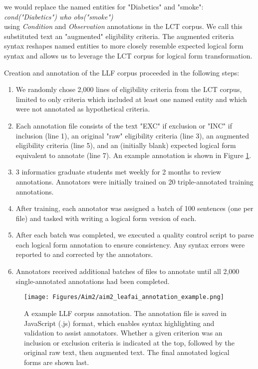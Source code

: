\documentclass[../main.tex]{subfiles}
\begin{document}
\noindent we would replace the named entities for "Diabetics" and "smoke": \\ 

\textit{cond("Diabetics") who obs("smoke")} \\

\noindent using \textit{Condition} and \textit{Observation} annotations in the LCT corpus. We call this substituted text an "augmented" eligibility criteria. The augmented criteria syntax reshapes named entities to more closely resemble expected logical form syntax and allows us to leverage the LCT corpus for logical form transformation.

Creation and annotation of the LLF corpus proceeded in the following steps:

\begin{enumerate}
    \item We randomly chose 2,000 lines of eligibility criteria from the LCT corpus, limited to only criteria which included at least one named entity and which were not annotated as hypothetical criteria.
    \item  Each annotation file consists of the text "EXC" if exclusion or "INC" if inclusion (line 1), an original "raw" eligibility criteria (line 3), an augmented eligibility criteria (line 5), and an (initially blank) expected logical form equivalent to annotate (line 7). An example annotation is shown in Figure \ref{aim2_annotation_example}.
    \item 3 informatics graduate students met weekly for 2 months to review annotations. Annotators were initially trained on 20 triple-annotated training annotations. 
    \item After training, each annotator was assigned a batch of 100 sentences (one per file) and tasked with writing a logical form version of each.
    \item After each batch was completed, we executed a quality control script to parse each logical form annotation to ensure consistency. Any syntax errors were reported to and corrected by the annotators.
    \item Annotators received additional batches of files to annotate until all 2,000 single-annotated annotations had been completed.
\end{enumerate}

\begin{figure}[h!]
  \centering
  \texttt{[image: Figures/Aim2/aim2\_leafai\_annotation\_example.png]}  
  \caption{A example LLF corpus annotation. The annotation file is saved in JavaScript (.js) format, which enables syntax highlighting and validation to assist annotators. Whether a given criterion was an inclusion or exclusion criteria is indicated at the top, followed by the original raw text, then augmented text. The final annotated logical forms are shown last.}
\label{aim2_annotation_example}
\end{figure}
\end{document}
